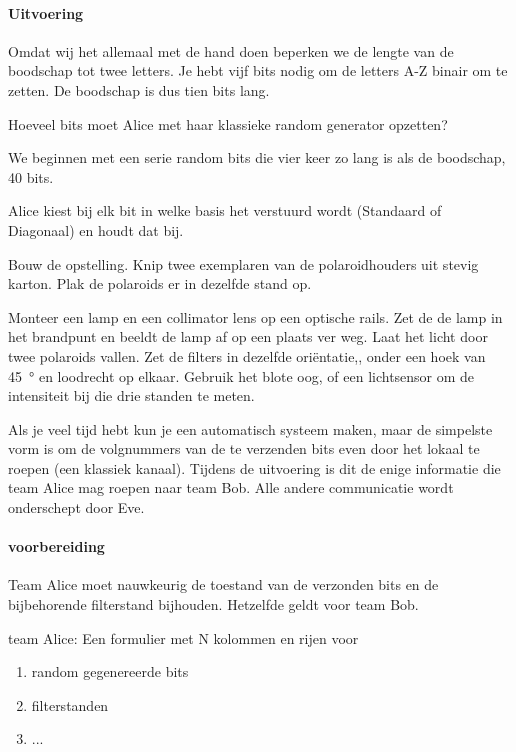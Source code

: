 \documentclass[../main.tex]{subfiles}
\begin{document}
\paragraph{Uitvoering}
Omdat wij het allemaal met de hand doen beperken we de lengte van de boodschap tot twee letters. 
Je hebt vijf bits nodig om de letters A-Z binair om te zetten. De boodschap is dus tien bits lang.

Hoeveel bits moet Alice met haar klassieke random generator opzetten?

 

We beginnen met een serie random bits die vier keer zo lang is als de boodschap, 40 bits.

Alice kiest bij elk bit in welke basis het verstuurd wordt (Standaard of Diagonaal) en houdt dat bij.


Bouw de opstelling. Knip twee exemplaren van de polaroidhouders uit stevig karton. Plak de polaroids er in dezelfde stand op. 

Monteer een lamp en een collimator lens op een optische rails. Zet de de lamp in het brandpunt en beeldt de lamp af op een plaats ver weg. Laat het licht door twee polaroids vallen. Zet de filters in dezelfde ori\"entatie,, onder een hoek van \SI{45}{\degree} en loodrecht op elkaar. Gebruik het blote oog, of een lichtsensor om de intensiteit bij die drie standen te meten.

Als je veel tijd hebt kun je een automatisch systeem maken, maar de simpelste vorm is om de volgnummers van de te verzenden bits even door het lokaal te roepen (een klassiek kanaal). Tijdens de uitvoering is dit de enige informatie die team Alice mag roepen naar team Bob. Alle andere communicatie wordt onderschept door Eve.


\paragraph{voorbereiding}

Team Alice moet nauwkeurig de toestand van de verzonden bits en de bijbehorende filterstand bijhouden. Hetzelfde geldt voor team Bob.

team Alice: Een formulier met N kolommen en rijen voor 
\begin{enumerate}

\item random gegenereerde bits

\item  filterstanden

\item ...
\end{enumerate}
\end{document}
